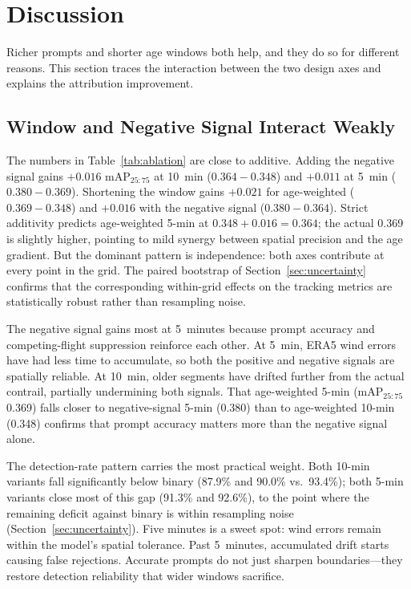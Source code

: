 \documentclass[review]{elsarticle}
\begin{document}
\section{Discussion}
\label{sec:discussion}

Richer prompts and shorter age windows both help, and they do so for different reasons. This section traces the interaction between the two design axes and explains the attribution improvement.

\subsection{Window and Negative Signal Interact Weakly}

The numbers in Table~\ref{tab:ablation} are close to additive. Adding the negative signal gains $+0.016$ mAP$_{25{:}75}$ at 10~min ($0.364 - 0.348$) and $+0.011$ at 5~min ($0.380 - 0.369$). Shortening the window gains $+0.021$ for age-weighted ($0.369 - 0.348$) and $+0.016$ with the negative signal ($0.380 - 0.364$). Strict additivity predicts age-weighted 5-min at $0.348 + 0.016 = 0.364$; the actual 0.369 is slightly higher, pointing to mild synergy between spatial precision and the age gradient. But the dominant pattern is independence: both axes contribute at every point in the grid. The paired bootstrap of Section~\ref{sec:uncertainty} confirms that the corresponding within-grid effects on the tracking metrics are statistically robust rather than resampling noise.

The negative signal gains most at 5~minutes because prompt accuracy and competing-flight suppression reinforce each other. At 5~min, ERA5 wind errors have had less time to accumulate, so both the positive and negative signals are spatially reliable. At 10~min, older segments have drifted further from the actual contrail, partially undermining both signals. That age-weighted 5-min (mAP$_{25{:}75}$ 0.369) falls closer to negative-signal 5-min (0.380) than to age-weighted 10-min (0.348) confirms that prompt accuracy matters more than the negative signal alone.

The detection-rate pattern carries the most practical weight. Both 10-min variants fall significantly below binary (87.9\% and 90.0\% vs.\ 93.4\%); both 5-min variants close most of this gap (91.3\% and 92.6\%), to the point where the remaining deficit against binary is within resampling noise (Section~\ref{sec:uncertainty}). Five minutes is a sweet spot: wind errors remain within the model's spatial tolerance. Past 5~minutes, accumulated drift starts causing false rejections. Accurate prompts do not just sharpen boundaries---they restore detection reliability that wider windows sacrifice.
\end{document}
